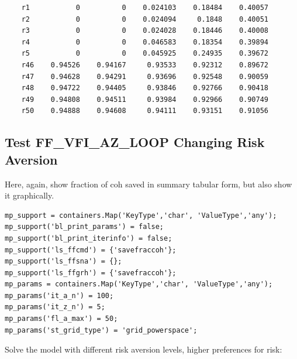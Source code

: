 \documentclass[
]{book}
\begin{document}
\begin{verbatim}
    r1           0          0    0.024103    0.18484    0.40057
    r2           0          0    0.024094     0.1848    0.40051
    r3           0          0    0.024028    0.18446    0.40008
    r4           0          0    0.046583    0.18354    0.39894
    r5           0          0    0.045925    0.24935    0.39672
    r46    0.94526    0.94167     0.93533    0.92312    0.89672
    r47    0.94628    0.94291     0.93696    0.92548    0.90059
    r48    0.94722    0.94405     0.93846    0.92766    0.90418
    r49    0.94808    0.94511     0.93984    0.92966    0.90749
    r50    0.94888    0.94608     0.94111    0.93151    0.91056
\end{verbatim}

\hypertarget{test-ff_vfi_az_loop-changing-risk-aversion}{%
\subsection{Test FF\_VFI\_AZ\_LOOP Changing Risk Aversion}\label{test-ff_vfi_az_loop-changing-risk-aversion}}

Here, again, show fraction of coh saved in summary tabular form, but
also show it graphically.

\begin{verbatim}
mp_support = containers.Map('KeyType','char', 'ValueType','any');
mp_support('bl_print_params') = false;
mp_support('bl_print_iterinfo') = false;
mp_support('ls_ffcmd') = {'savefraccoh'};
mp_support('ls_ffsna') = {};
mp_support('ls_ffgrh') = {'savefraccoh'};
mp_params = containers.Map('KeyType','char', 'ValueType','any');
mp_params('it_a_n') = 100;
mp_params('it_z_n') = 5;
mp_params('fl_a_max') = 50;
mp_params('st_grid_type') = 'grid_powerspace';
\end{verbatim}

Solve the model with different risk aversion levels, higher preferences
for risk:
\end{document}
